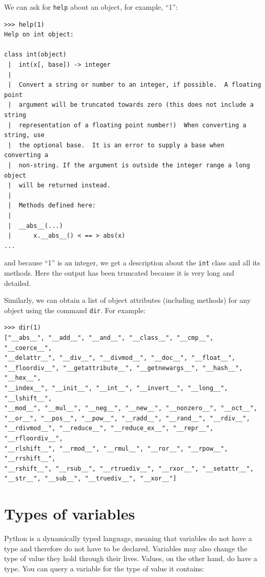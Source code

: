 \documentclass[justified, sixbynine]{tufte-book}
\def\ft{\small\tt}
\theoremstyle{plain}%
\newtheorem * {corollary}{Corollary}
\theoremstyle{definition}
\theoremstyle{remark}
\newtheorem * {remark}{Remark}
\newtheorem * {note}{Note}
\begin{document}
\begin{fullwidth}
We can ask for {\ft help} about an object, for example, ``1'':
\begin{lstlisting}
>>> help(1)
Help on int object:

class int(object)
 |  int(x[, base]) -> integer
 |
 |  Convert a string or number to an integer, if possible.  A floating point
 |  argument will be truncated towards zero (this does not include a string
 |  representation of a floating point number!)  When converting a string, use
 |  the optional base.  It is an error to supply a base when converting a
 |  non-string. If the argument is outside the integer range a long object
 |  will be returned instead.
 |
 |  Methods defined here:
 |
 |  __abs__(...)
 |      x.__abs__() < == > abs(x)
...
\end{lstlisting}
\noindent and because ``1'' is an integer, we get a description about the {\ft int} class and all its methods. Here the output has been truncated because it is very long and detailed.

Similarly, we can obtain a list of object attributes (including methods) for any object using the command {\ft dir}. For example:
\begin{lstlisting}
>>> dir(1)
["__abs__", "__add__", "__and__", "__class__", "__cmp__", "__coerce__", 
"__delattr__", "__div__", "__divmod__", "__doc__", "__float__", 
"__floordiv__", "__getattribute__", "__getnewargs__", "__hash__", "__hex__", 
"__index__", "__init__", "__int__", "__invert__", "__long__", "__lshift__", 
"__mod__", "__mul__", "__neg__", "__new__", "__nonzero__", "__oct__", 
"__or__", "__pos__", "__pow__", "__radd__", "__rand__", "__rdiv__", 
"__rdivmod__", "__reduce__", "__reduce_ex__", "__repr__", "__rfloordiv__", 
"__rlshift__", "__rmod__", "__rmul__", "__ror__", "__rpow__", "__rrshift__", 
"__rshift__", "__rsub__", "__rtruediv__", "__rxor__", "__setattr__", 
"__str__", "__sub__", "__truediv__", "__xor__"]
\end{lstlisting}

\goodbreak\section{Types of variables}

Python is a dynamically typed language, meaning that variables do not have a type and therefore do not have to be declared.  Variables may also change the type of value they hold through their lives.  Values, on the other hand, do have a type. You can query a variable for the type of value it contains:


\end{fullwidth}
\end{document}
